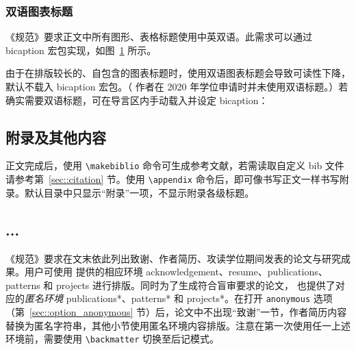 \documentclass[bachelor, comfort]{shtthesis}
\begin{document}
\subsection{双语图表标题}
《规范》要求正文中所有图形、表格标题使用中英双语。此需求可以通过 \textsf{bicaption} 宏包实现，如图~\ref{img::sht_logo} 所示。
\begin{figure}[htb]
  \centering
  \label{img::sht_logo}
\end{figure}

由于在排版较长的、自包含的图表标题时，使用双语图表标题会导致可读性下降，\shtthesis{} 默认不载入 \textsf{bicaption} 宏包。（ \shtthesis{} 作者在 2020 年学位申请时并未使用双语标题。）若确实需要双语标题，可在导言区内手动载入并设定 \textsf{bicaption}：
\begin{latex}
\usepackage[list=off]{bicaption}
\captionsetup[figure][bi-second]{name=Figure}
\captionsetup[table][bi-second]{name=Table}
\end{latex}

\section{附录及其他内容} \label{sec::backmatter}
正文完成后，使用 \verb|\makebiblio| 命令可生成参考文献，若需读取自定义 bib 文件请参考第~\ref{sec::citation} 节。使用 \verb|\appendix| 命令后，即可像书写正文一样书写附录。默认目录中只显示“附录”一项，不显示附录各级标题。
\begin{latex}
\appendix
\chapter{...}
\end{latex}

《规范》要求在文末依此列出致谢、作者简历、攻读学位期间发表的论文与研究成果。用户可使用 \shtthesis{} 提供的相应环境 acknowledgement、resume、publications、patterns 和 projects 进行排版。同时为了生成符合盲审要求的论文，\shtthesis{} 也提供了对应的\emph{匿名环境} publications*、patterns* 和 projects*。在打开 \verb|anonymous| 选项（第~\ref{sec::option_anonymous} 节）后，论文中不出现“致谢”一节，作者简历内容替换为匿名字符串，其他小节使用匿名环境内容排版。注意在第一次使用任一上述环境前，需要使用 \verb|\backmatter| 切换至后记模式。
\end{document}

